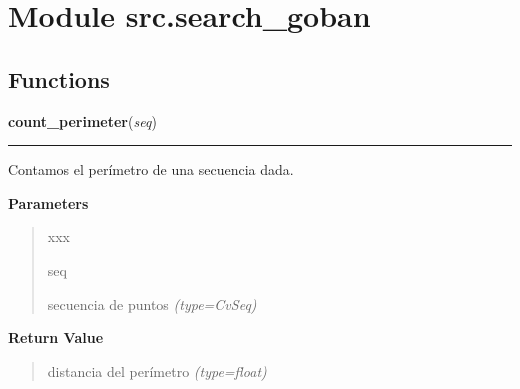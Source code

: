 %
%
%


\section{Module src.search\_goban}

    \label{src:search_goban}


  \subsection{Functions}

    \label{src:search_goban:count_perimeter}

    \vspace{0.5ex}

\hspace{.8\funcindent}\begin{boxedminipage}{\funcwidth}

    \raggedright \textbf{count\_perimeter}(\textit{seq})

    \vspace{-1.5ex}

    \rule{\textwidth}{0.5\fboxrule}
\setlength{\parskip}{2ex}
Contamos el perímetro de una secuencia dada.

\setlength{\parskip}{1ex}
      \textbf{Parameters}
      \vspace{-1ex}

      \begin{quote}
        \begin{Ventry}{xxx}

          \item[seq]


secuencia de puntos
            {\it (type=CvSeq)}

        \end{Ventry}

      \end{quote}

      \textbf{Return Value}
    \vspace{-1ex}

      \begin{quote}

distancia del perímetro
      {\it (type=float)}

      \end{quote}

    \end{boxedminipage}

